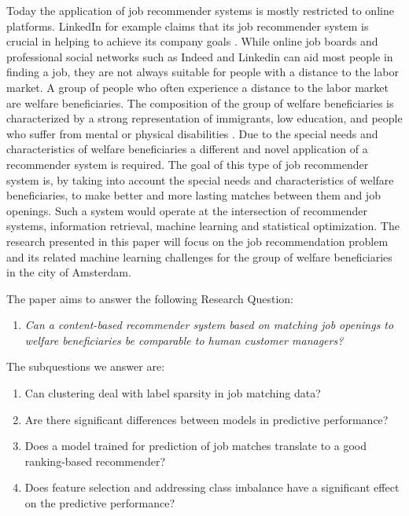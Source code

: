 Today the application of job recommender systems is mostly restricted to online platforms. 
LinkedIn for example claims that its job recommender system is crucial in helping to achieve its company goals \cite{kenthapadi2017personalized}.
While online job boards and professional social networks such as Indeed and Linkedin can aid most people in finding a job, they are not always suitable for people with a distance to the labor market.
A group of people who often experience a distance to the labor market are welfare beneficiaries. 
The composition of the group of welfare beneficiaries is characterized by a strong representation of immigrants, low education, and people who suffer from mental or physical disabilities \cite{dodeweerd}.
Due to the special needs and characteristics of welfare beneficiaries a different and novel application of a recommender system is required. 
The goal of this type of job recommender system is, by taking into account the special needs and characteristics of welfare beneficiaries, to make better and more lasting matches between them and job openings.
Such a system would operate at the intersection of recommender systems, information retrieval, machine learning and statistical optimization. 
The research presented in this paper will focus on the job recommendation problem and its related machine learning challenges for the group of welfare beneficiaries in the city of Amsterdam. 


The paper aims to answer the following Research Question:
\begin{enumerate}
    \item \em Can a content-based recommender system based on matching job openings to welfare beneficiaries be comparable to human customer managers? \label{rq:mrq}
\end{enumerate}{}

The subquestions we answer are:
\begin{enumerate}\addtocounter{enumi}{1}
    \item Can clustering deal with label sparsity in job matching data? \label{rq:cold}
    \item Are there significant differences between models in predictive performance? \label{rq:model}
    \item Does a model trained for prediction of job matches translate to a good ranking-based recommender? \label{rq:ranking}
    \item Does feature selection and addressing class imbalance have a significant effect on the predictive performance? \label{rq:strategies}
\end{enumerate}

